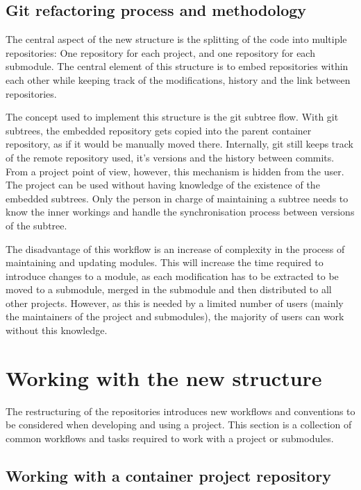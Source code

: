 \documentclass{scrartcl}
\begin{document}
\subsection{Git refactoring process and methodology}

The central aspect of the new structure is the splitting of the code
into multiple repositories: One repository for each project, and one
repository for each submodule. The central element of this structure
is to embed repositories within each other while keeping track of the
modifications, history and the link between repositories.

The concept used to implement this structure is the git subtree flow.
With git subtrees, the embedded repository gets copied into the parent
container repository, as if it would be manually moved
there. Internally, git still keeps track of the remote repository
used, it's versions and the history between commits. From a project
point of view, however, this mechanism is hidden from the user. The
project can be used without having knowledge of the existence of the
embedded subtrees. Only the person in charge of maintaining a subtree
needs to know the inner workings and handle the synchronisation
process between versions of the subtree.

The disadvantage of this workflow is an increase of complexity in the
process of maintaining and updating modules. This will increase the
time required to introduce changes to a module, as each modification
has to be extracted to be moved to a submodule, merged in the
submodule and then distributed to all other projects. However, as this
is needed by a limited number of users (mainly the maintainers of the
project and submodules), the majority of users can work without this
knowledge.

\section{Working with the new structure}
\label{sec:working}

The restructuring of the repositories introduces new workflows and
conventions to be considered when developing and using a project. This
section is a collection of common workflows and tasks required to work
with a project or submodules.

\subsection{Working with a container project repository}
\end{document}
